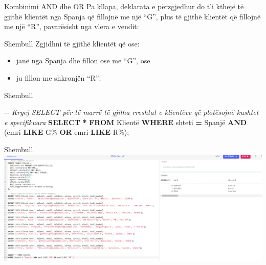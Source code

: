 \documentclass[
  ignorenonframetext,
]{beamer}
\newenvironment{Shaded}{\begin{snugshade}}{\end{snugshade}}
\newcommand{\CommentTok}[1]{\textcolor[rgb]{0.56,0.35,0.01}{\textit{#1}}}
\newcommand{\KeywordTok}[1]{\textcolor[rgb]{0.13,0.29,0.53}{\textbf{#1}}}
\newcommand{\NormalTok}[1]{#1}
\newcommand{\OperatorTok}[1]{\textcolor[rgb]{0.81,0.36,0.00}{\textbf{#1}}}
\newcommand{\StringTok}[1]{\textcolor[rgb]{0.31,0.60,0.02}{#1}}
\begin{document}
\begin{frame}{Kombinimi AND dhe OR}
\label{kombinimi-and-dhe-or-3}
Pa kllapa, deklarata e përzgjedhur do t'i kthejë të gjithë klientët nga
Spanja që fillojnë me një ``G'', plus të gjithë klientët që fillojnë me
një ``R'', pavarësisht nga vlera e vendit:
\end{frame}

\begin{frame}{Shembull}
\label{shembull-40}
Zgjidhni të gjithë klientët që ose:

\begin{itemize}
\item
  janë nga Spanja dhe fillon ose me ``G'', ose
\item
  ju fillon me shkronjën ``R'':
\end{itemize}
\end{frame}

\begin{frame}[fragile]{Shembull}
\label{shembull-41}

\begin{Shaded}
\begin{Highlighting}[]
\CommentTok{{-}{-} Kryej SELECT për të marrë të gjitha rreshtat e klientëve që plotësojnë kushtet e specifikuara}
\KeywordTok{SELECT} \OperatorTok{*} \KeywordTok{FROM}\NormalTok{ Klientë}
\KeywordTok{WHERE}\NormalTok{ shteti }\OperatorTok{=} \StringTok{\textquotesingle{}Spanjë\textquotesingle{}} \KeywordTok{AND}\NormalTok{ (emri }\KeywordTok{LIKE} \StringTok{\textquotesingle{}G\%\textquotesingle{}} \KeywordTok{OR}\NormalTok{ emri }\KeywordTok{LIKE} \StringTok{\textquotesingle{}R\%\textquotesingle{}}\NormalTok{);}
\end{Highlighting}
\end{Shaded}
\end{frame}

\begin{frame}{Shembull}
\label{shembull-42}
\includegraphics{./Figs/query21.png}
\end{frame}
\end{document}
